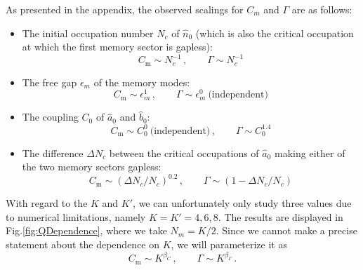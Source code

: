 \documentclass[aps,prd,reprint,superscriptaddress,nofootinbib]{revtex4-2}
\makeatletter
\newcommand*{\fig}{Fig.\@\xspace}
\makeatother
\begin{document}
As presented in the appendix, the observed scalings for $C_m$ and $\Gamma$ are as follows:
\begin{itemize}
	\item The initial occupation number $N_c$ of $\hat{n}_0$ (which is also the critical occupation at which the first memory sector is gapless):
	\begin{equation}\label{NDependence}
		C_{\text{m}} \sim  N_c^{-1}\,, \qquad \Gamma \sim N_c^{-1} 
	\end{equation}
	\item The free gap $\epsilon_m$ of the memory modes:
	\begin{equation}
	C_{\text{m}} \sim \epsilon_m^1 \,, \qquad \Gamma \sim \epsilon_m^0 \ \text{(independent)} 
	\end{equation}
	\item The coupling $C_0$ of $\hat{a}_0$ and $\hat{b}_0$:
	\begin{equation}\label{C0Dependence}
	C_{\text{m}} \sim C_0^{0}\ \text{(independent)}  \,, \qquad \Gamma \sim C_0^{1.4}
	\end{equation}
	\item The difference $\Delta N_c$ between the critical occupations of $\hat{a}_0$ making either of the two memory sectors gapless:
	\begin{equation}
	C_{\text{m}} \sim (\Delta N_c/N_c)^{0.2}  \,, \qquad \Gamma   \sim (1-\Delta N_c/N_c)
	\end{equation}
\end{itemize}

With regard to the $K$ and $K'$, we can unfortunately only study three values due to numerical limitations, namely $K=K'=4,6,8$. The results are displayed in \fig \ref{fig:QDependence}, where we take $N_m = K/2$. Since we cannot make a precise statement about the dependence on $K$, we will parameterize it as 
	\begin{equation}
 C_{\text{m}} \sim K^{\beta_C}  \,, \qquad \Gamma   \sim  K^{\beta_\Gamma} \,.
 \label{fitQ}
 \end{equation}

	
\end{document}
